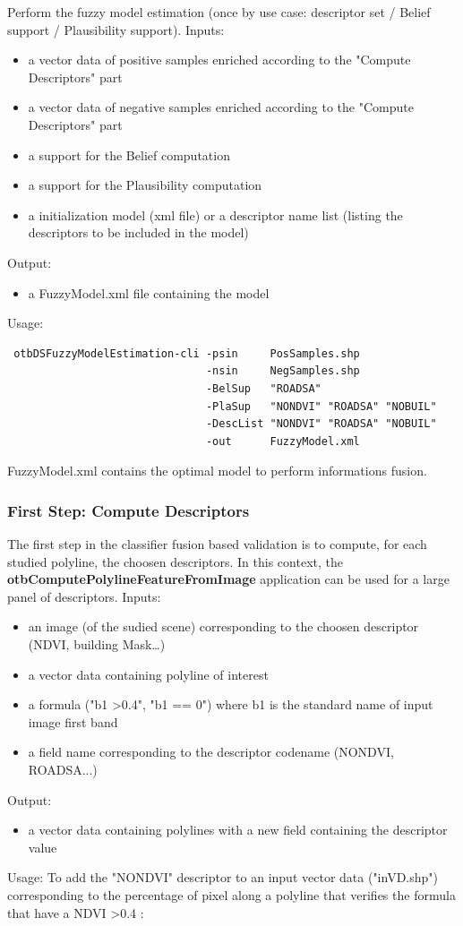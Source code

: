 Perform the fuzzy model estimation (once by use case: descriptor set / Belief support / Plausibility support).
Inputs:
\begin{itemize}
\item a vector data of positive samples enriched according to the "Compute Descriptors" part
\item a vector data of negative samples enriched according to the "Compute Descriptors" part
\item a support for the Belief computation
\item a support for the Plausibility computation
\item a initialization model (xml file) or a descriptor name list (listing the descriptors to be included in the model)
\end{itemize}
Output:
\begin{itemize}
\item a FuzzyModel.xml file containing the model
\end{itemize}
Usage:

\begin{verbatim}
 otbDSFuzzyModelEstimation-cli -psin     PosSamples.shp 
                               -nsin     NegSamples.shp 
                               -BelSup   "ROADSA" 
                               -PlaSup   "NONDVI" "ROADSA" "NOBUIL" 
                               -DescList "NONDVI" "ROADSA" "NOBUIL" 
                               -out      FuzzyModel.xml
\end{verbatim}

FuzzyModel.xml contains the optimal model to perform informations fusion.

\subsubsection{First Step: Compute Descriptors}

The first step in the classifier fusion based validation is to compute, for each studied polyline, the choosen descriptors. In this context, the \textbf{otbComputePolylineFeatureFromImage} application can be used for a large panel of descriptors.
Inputs:
\begin{itemize}
\item an image (of the sudied scene) corresponding to the choosen descriptor (NDVI, building Mask\dots)
\item a vector data containing polyline of interest
\item a formula ("b1 \textgreater 0.4", "b1 == 0") where b1 is the standard name of input image first band
\item a field name corresponding to the descriptor codename (NONDVI, ROADSA...)
\end{itemize}
Output:
\begin{itemize}
\item a vector data containing polylines with a new field containing the descriptor value
\end{itemize}
Usage: To add the "NONDVI" descriptor to an input vector data ("inVD.shp") corresponding to the percentage of pixel along a polyline that verifies the formula that have a NDVI \textgreater 0.4 :

